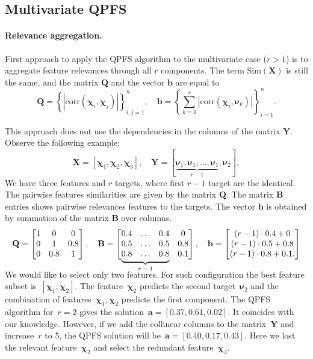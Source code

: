 \documentclass[12pt,twoside]{article}
\theoremstyle{definition}
\newcommand{\ba}{\mathbf{a}}
\newcommand{\bb}{\mathbf{b}}
\newcommand{\bY}{\mathbf{Y}}
\newcommand{\bX}{\mathbf{X}}
\newcommand{\bB}{\mathbf{B}}
\newcommand{\bQ}{\mathbf{Q}}
\newcommand{\bchi}{\boldsymbol{\chi}}
\newcommand{\bnu}{\boldsymbol{\nu}}
\newcommand\undermat[2]{%
	\makebox[0pt][l]{$\smash{\underbrace{\phantom{%
					\begin{matrix}#2\end{matrix}}}_{\text{$#1$}}}$}#2}
\begin{document}
\subsection{Multivariate QPFS}

\paragraph{Relevance aggregation.}

First approach to apply the QPFS algorithm to the multivariate case ($r > 1$) is to aggregate feature relevances through all $r$ components. The term $\text{Sim}(\bX)$ is still the same, and the matrix $\bQ$ and the vector $\bb$ are equal to
\begin{equation*}
\bQ = \left\{\left|\text{corr}(\bchi_i, \bchi_j)\right|\right\}_{i,j=1}^n, \quad \bb = \left\{\sum_{k=1}^r\left|\text{corr}(\bchi_i, \bnu_k)\right|\right\}_{i=1}^n.
\end{equation*}

This approach does not use the dependencies in the columns of the matrix $\bY$. Observe the following example:
\[
	\bX = [\bchi_1, \bchi_2, \bchi_3], \quad \bY = [\underbrace{\bnu_1, \bnu_1, \dots, \bnu_1}_{r-1}, \bnu_2],
\]
We have three features and $r$ targets, where first $r-1$ target are the identical.
The pairwise features similarities are given by the matrix $\bQ$.
The matrix $\bB$ entries shows pairwise relevances features to the targets.
The vector $\bb$ is obtained by summation of the matrix $\bB$ over columns.
\begin{equation}
	\bQ = \begin{bmatrix} 1 & 0 & 0\\ 0 & 1 & 0.8 \\ 0 & 0.8 & 1 \end{bmatrix}, \quad
	\bB = \begin{bmatrix} 0.4 & \dots & 0.4 & 0 \\ 0.5 & \dots & 0.5 & 0.8 \\ \undermat{r-1}{0.8 & \dots & 0.8} & 0.1 \end{bmatrix}, \quad
	\bb = \begin{bmatrix} (r-1) \cdot 0.4 + 0 \\ (r-1) \cdot 0.5 + 0.8 \\ (r-1) \cdot 0.8 + 0.1. \end{bmatrix}
	\label{eq:qpfs_example}
\end{equation}
	\vspace{0.5cm}

We would like to select only two features.
For such configuration the best feature subset is~$[\bchi_1, \bchi_2]$.
The feature~$\bchi_2$ predicts the second target~$\bnu_2$ and the combination of features~$\bchi_1, \bchi_2$ predicts the first component.
The QPFS algorithm for~$r=2$ gives the solution~$\ba = [0.37,	0.61,	0.02]$. It coincides with our knowledge.
However, if we add the collinear columns to the matrix~$\bY$ and increase~$r$ to 5, the QPFS solution will be~$\ba = [0.40,	0.17, 0.43]$.
Here we lost the relevant feature~$\bchi_2$ and select the redundant feature~$\bchi_3$.
\end{document}

